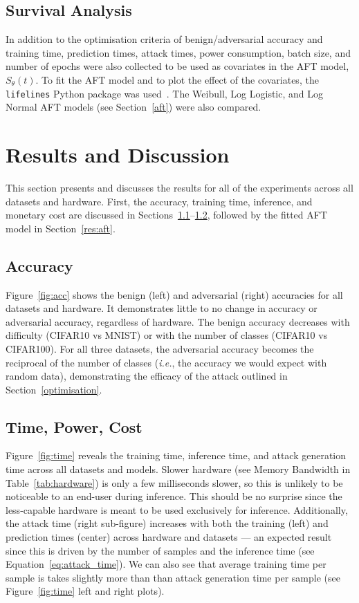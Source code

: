 \documentclass[sn-mathphys-num]{sn-jnl}%
\begin{document}
\subsection{Survival Analysis}

In addition to the optimisation criteria of benign/adversarial accuracy and training time, prediction times, attack times, power consumption, batch size, and number of epochs were also collected to be used as covariates in the AFT model, $S_{\theta}(t)$. To fit the AFT model and to plot the effect of the covariates, the \texttt{lifelines} Python package was used~\cite{lifelines}. The Weibull, Log Logistic, and Log Normal AFT models (see Section~\ref{aft}) were also compared.


\section{Results and Discussion}
\label{results}

This section presents and discusses the results for all of the experiments across all datasets and hardware. First, the accuracy, training time, inference, and monetary cost are discussed in Sections~\ref{res:acc}--\ref{res:cost}, followed by the fitted AFT model in Section~\ref{res:aft}.


\subsection{Accuracy}
\label{res:acc}

Figure~\ref{fig:acc} shows the benign (left) and adversarial (right) accuracies for all datasets and hardware. It demonstrates little to no change in accuracy or adversarial accuracy, regardless of hardware. The benign accuracy decreases with difficulty (CIFAR10 vs MNIST) or with the number of classes (CIFAR10 vs CIFAR100). For all three datasets, the adversarial accuracy becomes the reciprocal of the number of classes (\textit{i.e.}, the accuracy we would expect with random data), demonstrating the efficacy of the attack outlined in Section~\ref{optimisation}.



\subsection{Time, Power, Cost}
\label{res:cost}

Figure~\ref{fig:time} reveals the training time, inference time, and attack generation time across all datasets and models. Slower hardware (see Memory Bandwidth in Table~\ref{tab:hardware}) is only a few milliseconds slower, so this is unlikely to be noticeable to an end-user during inference. This should be no surprise since the less-capable hardware is meant to be used exclusively for inference. Additionally, the attack time (right sub-figure) increases with both the training (left) and prediction times (center) across hardware and datasets --- an expected result since this is driven by the number of samples and the inference time (see Equation~\ref{eq:attack_time}). We can also see that average training time per sample is takes slightly more than than attack generation time per sample (see Figure~\ref{fig:time} left and right plots).
\end{document}
